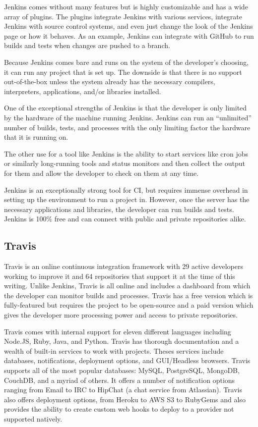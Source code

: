 \documentclass[12pt]{ucthesis}
\begin{document}
Jenkins comes without many features but is highly customizable and has a wide array of plugins. The plugins integrate Jenkins with various services, integrate Jenkins with source control systems, and even just change the look of the Jenkins page or how it behaves. As an example, Jenkins can integrate with GitHub to run builds and tests when changes are pushed to a branch.

Because Jenkins comes bare and runs on the system of the developer's choosing, it can run any project that is set up. The downside is that there is no support out-of-the-box unless the system already has the necessary compilers, interpreters, applications, and/or libraries installed.

One of the exceptional strengths of Jenkins is that the developer is only limited by the hardware of the machine running Jenkins. Jenkins can run an ``unlimited'' number of builds, tests, and processes with the only limiting factor the hardware that it is running on.

The other use for a tool like Jenkins is the ability to start services like cron jobs or similarly long-running tools and status monitors and then collect the output for them and allow the developer to check on them at any time.

Jenkins is an exceptionally strong tool for CI, but requires immense overhead in setting up the environment to run a project in. However, once the server has the necessary applications and libraries, the developer can run builds and tests. Jenkins is 100\% free and can connect with public and private repositories alike.

\subsection{Travis}
Travis \cite{Travis} is an online continuous integration framework with 29 active developers working to improve it and 64 repositories that support it at the time of this writing. Unlike Jenkins, Travis is all online and includes a dashboard from which the developer can monitor builds and processes. Travis has a free version which is fully-featured but requires the project to be open-source and a paid version which gives the developer more processing power and access to private repositories.

Travis comes with internal support for eleven different languages including Node.JS, Ruby, Java, and Python. Travis has thorough documentation and a wealth of built-in services to work with projects. Theses services include databases, notifications, deployment options, and GUI/Headless browsers. Travis supports all of the most popular databases: MySQL, PostgreSQL, MongoDB, CouchDB, and a myriad of others. It offers a number of notification options ranging from Email to IRC to HipChat (a chat service from Atlassian). Travis also offers deployment options, from Heroku to AWS S3 to RubyGems and also provides the ability to create custom web hooks to deploy to a provider not supported natively.
\end{document}

